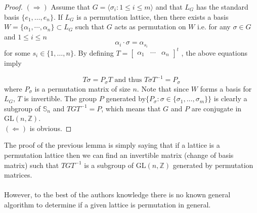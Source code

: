 \documentclass{article}
\theoremstyle{plain}
\theoremstyle{definition}
\newcommand{\Z}{\ensuremath{\mathbb{Z}}}
\begin{document}
\begin{proof}
$(\Rightarrow)$ Assume that $G = \langle \sigma_i: 1\leq i \leq m\rangle$ and that $L_G$ has the standard basis $\lbrace e_1, \ldots , e_n \rbrace$. If $L_G$ is a permutation lattice, then there exists a basis $W=\lbrace \alpha_1 , \cdots, \alpha_n \rbrace \subset L_G$ such that $ G$ acts as permutation on   $W$ i.e. for any $\sigma \in G$ and $1 \leq i \leq n$
\begin{displaymath}\label{sigma}
\alpha_i \cdot \sigma = \alpha_{s_i} 
\end{displaymath}
 for some $s_i \in  \lbrace 1, \ldots, n \rbrace$. By defining $T = \begin{bmatrix}
\alpha_1 & \cdots & \alpha_n
\end{bmatrix}^t $ , the above equations imply 
 
$$   T\sigma = P_{\sigma} T \,\, \text{and thus} \,\, T\sigma T^{-1} = P_{\sigma}$$ where $P_{\sigma}$ is a permutation matrix of size $n$. Note that since $W$ forms a basis for $L_G$, $T$ is invertible. The group $P$ generated by$\lbrace P_{\sigma}: \sigma \in \lbrace \sigma_1, \ldots, \sigma_m \rbrace \rbrace$ is clearly a subgroup of $\mathbb{S}_n$ and $TGT^{-1}= P$, which means that $G$ and $P$ are conjugate in $\mathrm{GL}(n,\Z)$.\\
$(\Leftarrow)$ is obvious.
\end{proof}
\noindent
The proof of the previous lemma is simply saying that if a lattice is a permutation lattice then we can find an invertible matrix (change of basis matrix) such that $TGT^{-1}$ is a subgroup of $\mathrm{GL}(n,\Z)$ generated by permutation matrices.\\
\\
However, to the best of the authors knowledge there is no known general algorithm to determine if a given lattice is permutation in general. \\
\\
\end{document}
